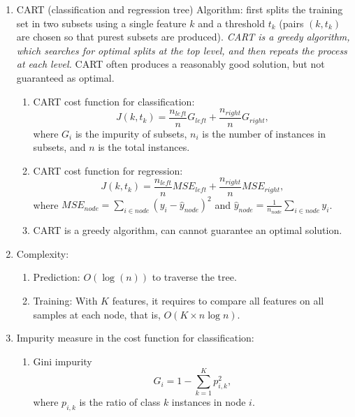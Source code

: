 \documentclass[12pt,oneside,a4paper]{article}
\numberwithin{equation}{section}
\newcommand{\wh}[1]{\widehat{#1}}
\begin{document}
\begin{enumerate}
\item CART (classification and regression tree) Algorithm: first splits the training set in two subsets using a single feature $k$ and a threshold $t_k$ (pairs $(k, t_k)$ are chosen so that purest subsets are produced). \emph{CART is a greedy algorithm, which searches for optimal splits at the top level, and then repeats the process at each level.} CART often produces a reasonably good solution, but not guaranteed as optimal.

\begin{enumerate}
\item CART cost function for classification: 
\begin{equation}
J(k, t_k) = \frac{n_{left}}{n} G_{left} + \frac{n_{right}}{n} G_{right},
\end{equation}
where $G_{i}$ is the impurity of subsets, $n_{i}$ is the number of instances in subsets, and $n$ is the total instances.

\item CART cost function for regression: 
\begin{equation}
J(k, t_k)= \frac{n_{left}}{n} MSE_{left} + \frac{n_{right}}{n} MSE_{right},
\end{equation}
where $MSE_{node} = \sum_{i \in node} (y_i - \wh{y}_{node})^2$ and $\wh{y}_{node} = \frac{1}{n_{node}}\sum_{i \in node} y_i$.

\item CART is a greedy algorithm, can cannot guarantee an optimal solution.
\end{enumerate}

\item Complexity:
\begin{enumerate}
\item Prediction: $O(\log(n))$ to traverse the tree.
\item Training: With $K$ features, it requires to compare all features on all samples at each node, that is, $O(K \times n \log n)$.
\end{enumerate}

\item Impurity measure in the cost function for classification: 
\begin{enumerate}
\item Gini impurity
\begin{equation}
G_i = 1 - \sum_{k=1}^{K} p_{i, k}^2,
\end{equation}
where $p_{i,k}$ is the ratio of class $k$ instances in node $i$.


\end{enumerate}
\end{enumerate}
\end{document}
